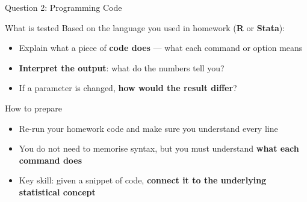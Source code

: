 \documentclass[dvipsnames,hyperref={pdfpagelabels=false}]{beamer}
\begin{document}
\begin{frame}{Question 2: Programming Code}

\begin{block}{What is tested}
	Based on the language you used in homework (\textbf{R} or \textbf{Stata}):
	\begin{itemize}
		\vspace{0.1cm}
		\item Explain what a piece of \textbf{code does} --- what each command or option means
		\vspace{0.1cm}
		\item \textbf{Interpret the output}: what do the numbers tell you?
		\vspace{0.1cm}
		\item If a parameter is changed, \textbf{how would the result differ}?
	\end{itemize}
\end{block}

\vspace{0.3cm}

\begin{exampleblock}{How to prepare}
	\begin{itemize}
		\item Re-run your homework code and make sure you understand every line
		\vspace{0.1cm}
		\item You do not need to memorise syntax, but you must understand \textbf{what each command does}
		\vspace{0.1cm}
		\item Key skill: given a snippet of code, \textbf{connect it to the underlying statistical concept}
	\end{itemize}
\end{exampleblock}

\end{frame}
\end{document}
